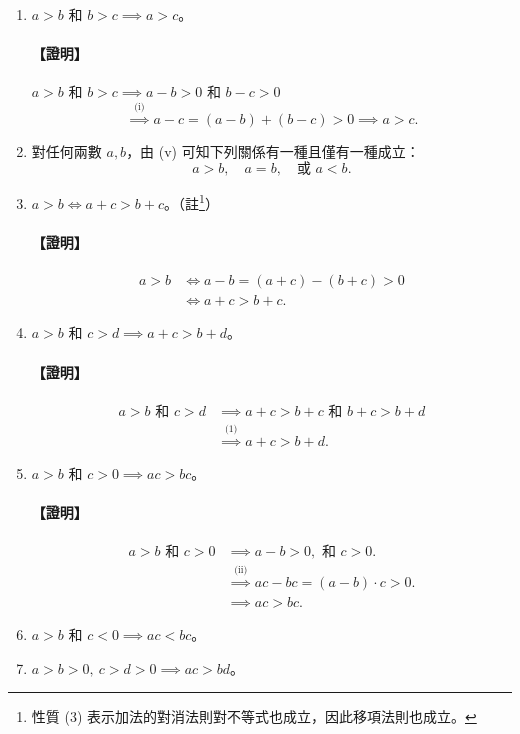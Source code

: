 \begin{enumerate}[(1)]
    \item $a>b \text{ 和 } b>c \implies a>c$。
\paragraph{【證明】} $a>b \text{ 和 } b>c \implies a-b>0 \text{ 和 } b-c>0$
    \[
    \overset{\text{(i)}}{\implies} a-c = (a-b)+(b-c) > 0 \implies a>c.
    \]

    \item 對任何兩數 $a, b$，由 (v) 可知下列關係有一種且僅有一種成立：
    \[
    a>b,\quad a=b,\quad \text{或 } a<b.
    \]

    \item $a>b \iff a+c > b+c$。\quad （註\footnote{性質 (3) 表示加法的對消法則對不等式也成立，因此移項法則也成立。}）
\paragraph{【證明】} 
    \begin{align*}
    a>b &\iff a-b=(a+c)-(b+c)>0 \\
    &\iff a+c>b+c.
    \end{align*}

    \item $a>b \text{ 和 } c>d \implies a+c>b+d$。
\paragraph{【證明】} 
    \begin{align*}
    a>b \text{ 和 } c>d &\implies a+c>b+c \text{ 和 } b+c>b+d \\
    &\overset{\text{(1)}}{\implies} a+c>b+d.
    \end{align*}

    \item $a>b \text{ 和 } c>0 \implies ac>bc$。
\paragraph{【證明】} 
    \begin{align*}
    a>b \text{ 和 } c>0 &\implies a-b>0, \text{ 和 } c>0. \\
    &\overset{\text{(ii)}}{\implies} ac-bc = (a-b)\cdot c > 0. \\
    &\implies ac>bc.
    \end{align*}

    \item $a>b \text{ 和 } c<0 \implies ac<bc$。

    \item $a>b>0,\ c>d>0 \implies ac>bd$。
\end{enumerate}

